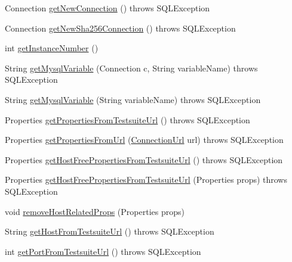 \begin{DoxyCompactItemize}
\item 
Connection \mbox{\hyperlink{classtestsuite_1_1_base_test_case_af4fbedf355c4e4adc888e5acb709694f}{get\+New\+Connection}} ()  throws S\+Q\+L\+Exception 
\item 
Connection \mbox{\hyperlink{classtestsuite_1_1_base_test_case_af0bcfb0a02343c87cca38ff29fae2f4d}{get\+New\+Sha256\+Connection}} ()  throws S\+Q\+L\+Exception 
\item 
int \mbox{\hyperlink{classtestsuite_1_1_base_test_case_a06bbcacd72ff13e3905c04aada69feea}{get\+Instance\+Number}} ()
\item 
String \mbox{\hyperlink{classtestsuite_1_1_base_test_case_a234990bc9494798d81b98dd40e7fe4eb}{get\+Mysql\+Variable}} (Connection c, String variable\+Name)  throws S\+Q\+L\+Exception 
\item 
String \mbox{\hyperlink{classtestsuite_1_1_base_test_case_ac50ae23586e12eaab184308368a6fb1d}{get\+Mysql\+Variable}} (String variable\+Name)  throws S\+Q\+L\+Exception 
\item 
Properties \mbox{\hyperlink{classtestsuite_1_1_base_test_case_ab63fc653810c4915e190196e7b3d6e6c}{get\+Properties\+From\+Testsuite\+Url}} ()  throws S\+Q\+L\+Exception 
\item 
Properties \mbox{\hyperlink{classtestsuite_1_1_base_test_case_aec421614a4dc2ce6816ebb64a25db62b}{get\+Properties\+From\+Url}} (\mbox{\hyperlink{classcom_1_1mysql_1_1cj_1_1conf_1_1_connection_url}{Connection\+Url}} url)  throws S\+Q\+L\+Exception 
\item 
Properties \mbox{\hyperlink{classtestsuite_1_1_base_test_case_a5a75db77f31d0984a0d1331dc49cadc0}{get\+Host\+Free\+Properties\+From\+Testsuite\+Url}} ()  throws S\+Q\+L\+Exception 
\item 
Properties \mbox{\hyperlink{classtestsuite_1_1_base_test_case_af5813dd273ec517ee7393be19e26c3e7}{get\+Host\+Free\+Properties\+From\+Testsuite\+Url}} (Properties props)  throws S\+Q\+L\+Exception 
\item 
void \mbox{\hyperlink{classtestsuite_1_1_base_test_case_a5ca1f452f4a88327c0d35a85f1322d46}{remove\+Host\+Related\+Props}} (Properties props)
\item 
String \mbox{\hyperlink{classtestsuite_1_1_base_test_case_a1b58f06989895f6eef650ebfd9d5a5e5}{get\+Host\+From\+Testsuite\+Url}} ()  throws S\+Q\+L\+Exception 
\item 
int \mbox{\hyperlink{classtestsuite_1_1_base_test_case_a9d6bd0f4c3628800fb4b39ba3c9c77f6}{get\+Port\+From\+Testsuite\+Url}} ()  throws S\+Q\+L\+Exception 
\item 

\end{DoxyCompactItemize}
